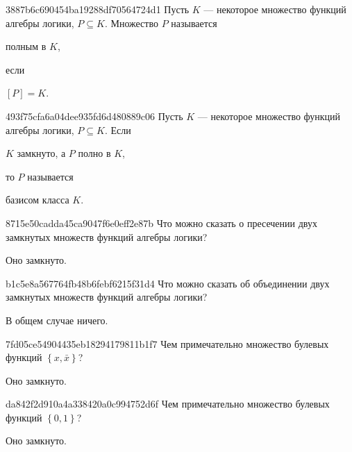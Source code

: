 \begin{note}{3887b6c690454ba19288df70564724d1}
    Пусть \({ K }\) --- некоторое множество функций алгебры логики, \({ P \subseteq K }\).
    Множество \({ P }\) называется \begin{icloze}{2}полным в \({ K }\),\end{icloze} если \begin{icloze}{1}\({ \left[ P \right] = K }\).\end{icloze}
\end{note}

\begin{note}{493f75cfa6a04dee935fd6d480889c06}
    Пусть \({ K }\) --- некоторое множество функций алгебры логики, \({ P \subseteq K }\).
    Если \begin{icloze}{2}\({ K }\) замкнуто, а \({ P }\) полно в \({ K }\),\end{icloze} то \({ P }\) называется \begin{icloze}{1}базисом класса \({ K }\).\end{icloze}
\end{note}

\begin{note}{8715e50cadda45ca9047f6e0eff2e87b}
    Что можно сказать о пресечении двух замкнутых множеств функций алгебры логики?

    \begin{cloze}{1}
        Оно замкнуто.
    \end{cloze}
\end{note}

\begin{note}{b1c5e8a567764fb48b6febf6215f31d4}
    Что можно сказать об объединении двух замкнутых множеств функций алгебры логики?

    \begin{cloze}{1}
        В общем случае ничего.
    \end{cloze}
\end{note}

\begin{note}{7fd05ce54904435eb18294179811b1f7}
    Чем примечательно множество булевых функций \({ \left\{ x, \bar x \right\} }\)?

    \begin{cloze}{1}
        Оно замкнуто.
    \end{cloze}
\end{note}

\begin{note}{da842f2d910a4a338420a0c994752d6f}
    Чем примечательно множество булевых функций \({ \left\{ 0, 1 \right\} }\)?

    \begin{cloze}{1}
        Оно замкнуто.
    \end{cloze}
\end{note}

